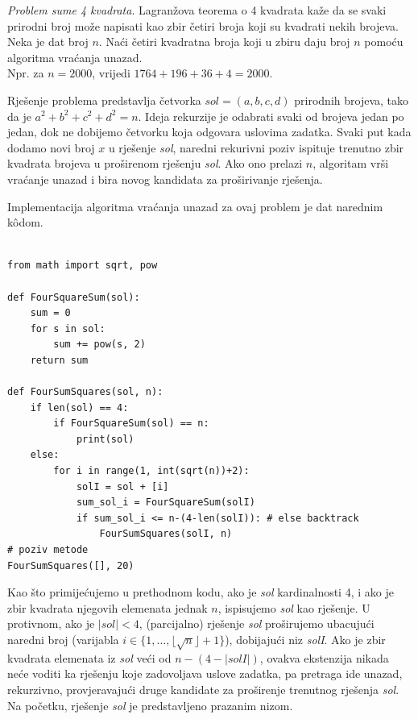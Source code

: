 
\begin{example}
	\textit{Problem sume 4 kvadrata}. Lagranžova teorema o 4 kvadrata kaže da se svaki prirodni broj može napisati kao zbir četiri broja koji su kvadrati nekih brojeva. Neka je dat broj $n$. Naći četiri kvadratna broja koji u zbiru daju broj $n$ pomoću algoritma vraćanja unazad. \\
	Npr. za $n=2000$, vrijedi $1764 + 196 + 36 + 4 = 2000. $
\end{example}

\begin{solution}
	Rješenje problema predstavlja četvorka $sol = (a, b, c, d)$ prirodnih brojeva, tako da je $a^2 + b^2 + c^2 + d^2 = n$. Ideja rekurzije je odabrati svaki  od brojeva jedan po jedan, dok ne dobijemo četvorku koja odgovara uslovima zadatka. Svaki put kada dodamo novi broj $x$ u rješenje \emph{sol}, naredni rekurivni poziv ispituje trenutno zbir kvadrata brojeva u proširenom rješenju \emph{sol}. Ako ono prelazi $n$, algoritam vrši vraćanje unazad i bira novog kandidata za proširivanje rješenja. 
	
 Implementacija algoritma vraćanja unazad za ovaj problem je dat narednim k\^odom.
 
 \begin{verbatim}
 	  
from math import sqrt, pow

def FourSquareSum(sol):
	sum = 0
	for s in sol:
		sum += pow(s, 2)
	return sum

def FourSumSquares(sol, n):
	if len(sol) == 4:
		if FourSquareSum(sol) == n:
			print(sol)
	else:
		for i in range(1, int(sqrt(n))+2):
			solI = sol + [i]
			sum_sol_i = FourSquareSum(solI)
			if sum_sol_i <= n-(4-len(solI)): # else backtrack  
				FourSumSquares(solI, n) 
# poziv metode
FourSumSquares([], 20)
 \end{verbatim}
	
	Kao što primijećujemo u prethodnom kodu, ako je \emph{sol} kardinalnosti 4, i ako je zbir kvadrata njegovih elemenata jednak $n$, ispisujemo \emph{sol} kao rješenje. U protivnom, ako je $|sol|<4$, (parcijalno) rješenje \emph{sol} proširujemo ubacujući naredni broj (varijabla $i\in \{1, \ldots, \lfloor\sqrt{n} \rfloor + 1 \}$), dobijajući niz \emph{solI}.  Ako je zbir kvadrata elemenata iz \emph{sol} veći od $n-(4 - |solI|)$, ovakva ekstenzija nikada neće voditi ka rješenju koje zadovoljava uslove zadatka, pa pretraga ide unazad, rekurzivno, provjeravajući druge kandidate za proširenje trenutnog rješenja \emph{sol}. Na početku, rješenje \emph{sol} je predstavljeno prazanim nizom.
	 
\end{solution}
 
